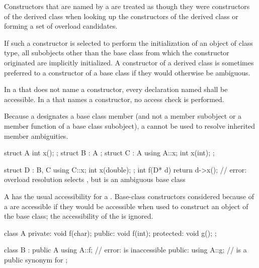 \pnum
Constructors that are named by a 
are treated as though they were constructors of the derived class
when looking up the constructors of the derived class
or forming a set of overload candidates.
\begin{note}
If such a constructor is selected to perform the initialization
of an object of class type, all subobjects other than the base class
from which the constructor originated
are implicitly initialized.
A constructor of a derived class is sometimes preferred to a constructor of a base class
if they would otherwise be ambiguous.
\end{note}

\pnum
{}%
In a  that does not name a constructor,
every declaration named shall be accessible.
In a  that names a constructor,
no access check is performed.

\pnum
\begin{note}
Because a  designates a base class member
(and not a member subobject or a member function of a base class
subobject), a  cannot be used to resolve
inherited member ambiguities.
\begin{example}
\begin{codeblock}
struct A { int x(); };
struct B : A { };
struct C : A {
  using A::x;
  int x(int);
};

struct D : B, C {
  using C::x;
  int x(double);
};
int f(D* d) {
  return d->x();    // error: overload resolution selects , but  is an ambiguous base class
}
\end{codeblock}
\end{example}
\end{note}

\pnum
A  has the usual
accessibility for a .
Base-class constructors considered because of a 
are accessible if they would be accessible
when used to construct an object of the base class;
the accessibility of the  is ignored.
\begin{example}
\begin{codeblock}
class A {
private:
    void f(char);
public:
    void f(int);
protected:
    void g();
};

class B : public A {
  using A::f;       // error:  is inaccessible
public:
  using A::g;       //  is a public synonym for 
};
\end{codeblock}
\end{example}

